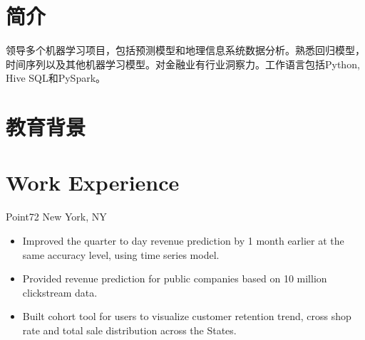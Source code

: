 \documentclass[11pt,a4paper,roman]{moderncv} %
\begin{document}
\makecvtitle %

\section{简介}  {\small 领导多个机器学习项目，包括预测模型和地理信息系统数据分析。熟悉回归模型，时间序列以及其他机器学习模型。对金融业有行业洞察力。工作语言包括Python, Hive SQL和PySpark。}

\section{教育背景}


\section{Work Experience}
{Point72}
{New York, NY}{}
{\begin{itemize}  %
	\item Improved the quarter to day revenue prediction by 1 month earlier at the same accuracy level, using time series model.
	
	\item Provided revenue prediction for public companies based on 10 million clickstream data.
	\item Built cohort tool for users to visualize customer retention trend, cross shop rate and total sale distribution across the States.
\end{itemize}}
\end{document}
